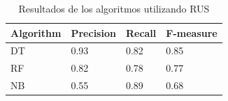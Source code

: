 \begin{table}[H]
\centering
\captionsetup{labelsep=period, labelfont=bf}
\caption{Resultados de los algoritmos utilizando RUS}
\fontsize{12pt}{10pt}\selectfont
\begin{tabular}{llll}
\toprule 
\textbf{Algorithm} & \textbf{Precision} & \textbf{Recall} & \textbf{F-measure} \\ 
\midrule 
DT & 0.93 & 0.82 & 0.85 \\ 
RF & 0.82 & 0.78 & 0.77 \\ 
NB & 0.55 & 0.89 & 0.68 \\ 
\bottomrule
\end{tabular}

\label{tab:rus_results}
\end{table}
